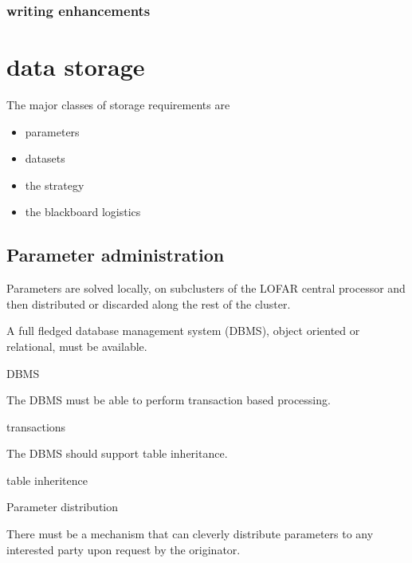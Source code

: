 \documentclass[]{lofar}
\begin{document}
      \subsubsection{writing enhancements}

  \section{data storage}
  \label{sec:data-storage}\hypertarget{sec:data-storage}{}

    The major classes of storage requirements are

    \begin{itemize}
      \item parameters
      \item datasets
      \item the strategy
      \item the blackboard logistics
    \end{itemize}

    \subsection{Parameter administration}
    \label{subsec:parameter-administration}\hypertarget{subsec:parameter-administration}{}

      Parameters are solved locally, on subclusters of the LOFAR
      central processor and then distributed or discarded along the
      rest of the cluster.

      \begin{prerequisite}
        A full fledged database management system (DBMS),
        object oriented or relational, must be available.
        \caption{DBMS\label{pre:dbms}}
      \end{prerequisite}

      \begin{prerequisite}
        The DBMS must be able to perform transaction based processing.
        \caption{transactions\label{pre:transactions}}
      \end{prerequisite}

      \begin{prerequisite}
        The DBMS should support table inheritance.
        \caption{table inheritence\label{pre:table-inheritance}}
      \end{prerequisite}

      \begin{requirement}
        \caption{Parameter distribution\label{req:parameter-distribution}}
        There must be a mechanism that can cleverly distribute
        parameters to any interested party upon request by the
        originator.
      \end{requirement}
\end{document}
